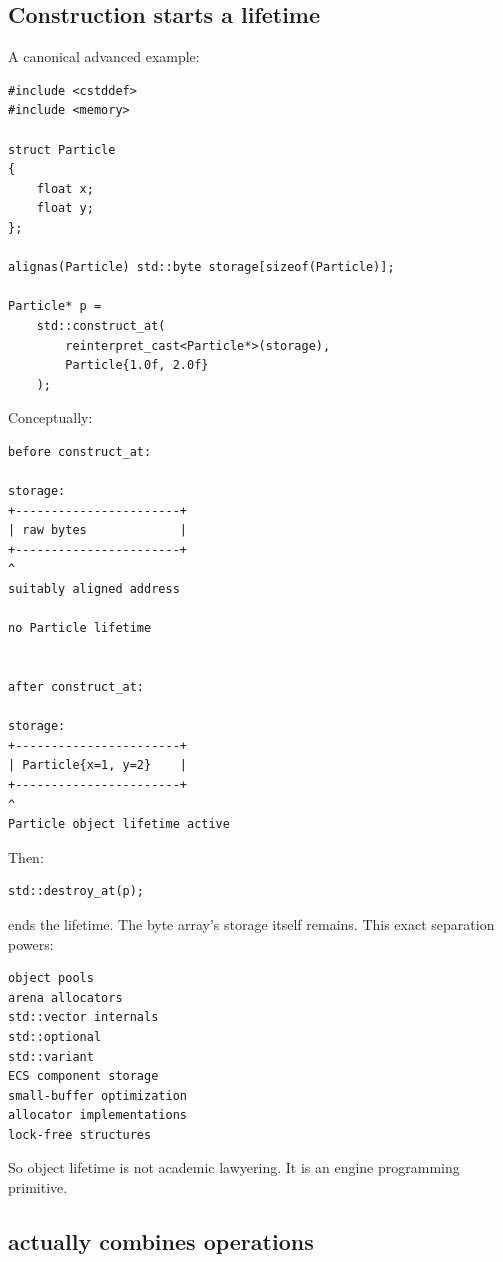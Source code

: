 \subsection{Construction starts a lifetime}\label{05-engine-i-ch002-construction-starts-a-lifetime}

\hypertarget{05-engine-i-ch002-construction-starts-a-lifetime}{}

A canonical advanced example:

\begin{verbatim}
#include <cstddef>
#include <memory>

struct Particle
{
    float x;
    float y;
};

alignas(Particle) std::byte storage[sizeof(Particle)];

Particle* p =
    std::construct_at(
        reinterpret_cast<Particle*>(storage),
        Particle{1.0f, 2.0f}
    );
\end{verbatim}

Conceptually:

\begin{verbatim}
before construct_at:

storage:
+-----------------------+
| raw bytes             |
+-----------------------+
^
suitably aligned address

no Particle lifetime


after construct_at:

storage:
+-----------------------+
| Particle{x=1, y=2}    |
+-----------------------+
^
Particle object lifetime active
\end{verbatim}

Then:

\begin{verbatim}
std::destroy_at(p);
\end{verbatim}

ends the  lifetime. The byte array's storage itself remains. This exact separation powers:

\begin{verbatim}
object pools
arena allocators
std::vector internals
std::optional
std::variant
ECS component storage
small-buffer optimization
allocator implementations
lock-free structures
\end{verbatim}

So object lifetime is not academic lawyering. It is an engine programming primitive.

\subsection{\texorpdfstring{ actually combines operations}{ actually combines operations}}\label{05-engine-i-ch002-new-actually-combines-operations}

